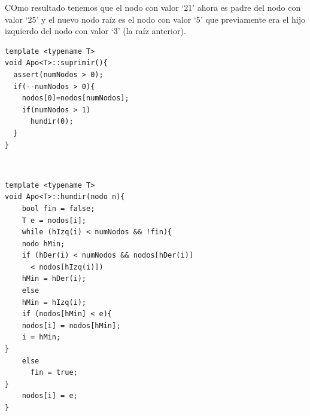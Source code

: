 COmo resultado tenemos que el nodo con valor `21' ahora es padre del nodo con valor `25' y el nuevo nodo raíz es el nodo con valor `5' que previamente era el hijo izquierdo del nodo con valor `3' (la raíz anterior).

\begin{verbatim}
template <typename T>
void Apo<T>::suprimir(){
  assert(numNodos > 0);
  if(--numNodos > 0){
    nodos[0]=nodos[numNodos];
    if(numNodos > 1)
      hundir(0);
  }
}
\end{verbatim}
\\
\begin{verbatim}
template <typename T>
void Apo<T>::hundir(nodo n){
	bool fin = false;
	T e = nodos[i];
	while (hIzq(i) < numNodos && !fin){
	nodo hMin;
	if (hDer(i) < numNodos && nodos[hDer(i)] 
      < nodos[hIzq(i)])
	hMin = hDer(i);
	else
	hMin = hIzq(i);
	if (nodos[hMin] < e){
	nodos[i] = nodos[hMin];
	i = hMin;
}
	else
	  fin = true;
}
	nodos[i] = e;
}
\end{verbatim}